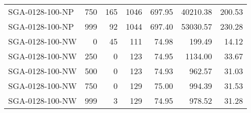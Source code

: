 \begin{table}[htbp]
{\begin{tabular}{lrrrrrr}
    SGA-0128-100-NP & 750    & 165    & 1046   & 697.95 & 40210.38 & 200.53 \\
    SGA-0128-100-NP & 999    & 92     & 1044   & 697.40 & 53030.57 & 230.28 \\ \hline
    SGA-0128-100-NW & 0      & 45     & 111    & 74.98  & 199.49 & 14.12 \\
    SGA-0128-100-NW & 250    & 0      & 123    & 74.95  & 1134.00 & 33.67 \\
    SGA-0128-100-NW & 500    & 0      & 123    & 74.93  & 962.57 & 31.03 \\
    SGA-0128-100-NW & 750    & 0      & 129    & 75.00  & 994.39 & 31.53 \\
    SGA-0128-100-NW & 999    & 3      & 129    & 74.95  & 978.52 & 31.28 \\
    \bottomrule
    \end{tabular}}
  \label{tab:addlabel}%
\end{table}%
